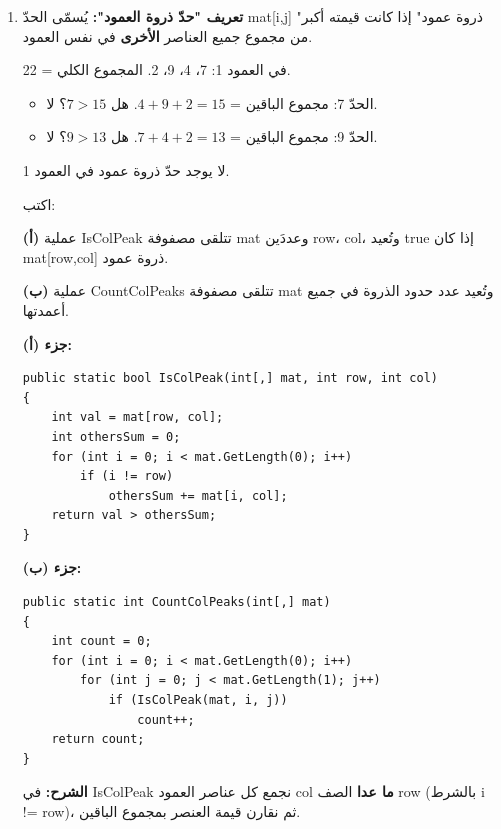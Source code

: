 \documentclass[14pt]{extarticle}
\begin{document}
\begin{enumerate}[itemsep=2em]

\item
\textbf{تعريف "حدّ ذروة العمود":} يُسمّى الحدّ \textenglish{mat[i,j]} "ذروة عمود" إذا كانت قيمته أكبر من مجموع جميع العناصر \textbf{الأخرى} في نفس العمود.

\begin{boxExample}
في العمود 1: \textenglish{7، 4، 9، 2}. المجموع الكلي = 22.
\begin{itemize}[itemsep=1pt]
    \item الحدّ 7: مجموع الباقين = $4+9+2=15$. هل $7>15$؟ لا.
    \item الحدّ 9: مجموع الباقين = $7+4+2=13$. هل $9>13$؟ لا.
\end{itemize}
لا يوجد حدّ ذروة عمود في العمود 1.
\end{boxExample}

اكتب:

\textbf{(أ)} عملية \textenglish{IsColPeak} تتلقى مصفوفة \textenglish{mat} وعددَين \textenglish{row}، \textenglish{col}، وتُعيد \textenglish{true} إذا كان \textenglish{mat[row,col]} ذروة عمود.

\textbf{(ب)} عملية \textenglish{CountColPeaks} تتلقى مصفوفة \textenglish{mat} وتُعيد عدد حدود الذروة في جميع أعمدتها.

\ifwithsols
\begin{boxSolution}
\textbf{جزء (أ):}
\begin{boxCode}
\begin{english}
\begin{verbatim}
public static bool IsColPeak(int[,] mat, int row, int col)
{
    int val = mat[row, col];
    int othersSum = 0;
    for (int i = 0; i < mat.GetLength(0); i++)
        if (i != row)
            othersSum += mat[i, col];
    return val > othersSum;
}
\end{verbatim}
\end{english}
\end{boxCode}

\textbf{جزء (ب):}
\begin{boxCode}
\begin{english}
\begin{verbatim}
public static int CountColPeaks(int[,] mat)
{
    int count = 0;
    for (int i = 0; i < mat.GetLength(0); i++)
        for (int j = 0; j < mat.GetLength(1); j++)
            if (IsColPeak(mat, i, j))
                count++;
    return count;
}
\end{verbatim}
\end{english}
\end{boxCode}
\textbf{الشرح:} في \textenglish{IsColPeak} نجمع كل عناصر العمود \textenglish{col} \textbf{ما عدا} الصف \textenglish{row} (بالشرط \textenglish{i != row})، ثم نقارن قيمة العنصر بمجموع الباقين.
\end{boxSolution}
\fi


\end{enumerate}
\end{document}
